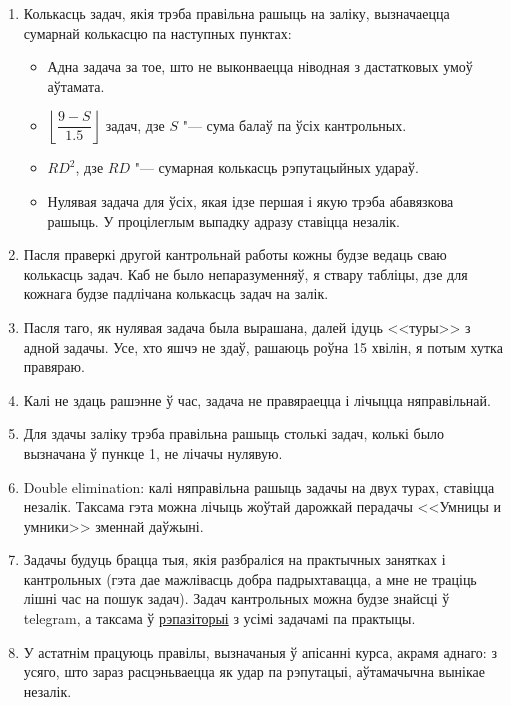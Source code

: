 \documentclass[12pt, a4paper]{extarticle}
\begin{document}
    \begin{enumerate}
        \item Колькасць задач, якія трэба правільна рашыць на заліку, вызначаецца сумарнай колькасцю па наступных пунктах:
        \begin{itemize}
            \item Адна задача за тое, што не выконваецца ніводная з дастатковых умоў аўтамата.
            \item $\left\lfloor \dfrac{9 - S}{1.5} \right\rfloor$ задач, дзе $S$ "--- сума балаў па ўсіх кантрольных.
            \item $RD^2$, дзе $RD$ "--- сумарная колькасць рэпутацыйных удараў.
            \item Нулявая задача для ўсіх, якая ідзе першая і якую трэба абавязкова рашыць. У процілеглым выпадку адразу ставіцца незалік.
        \end{itemize}
        \item Пасля праверкі другой кантрольнай работы кожны будзе ведаць сваю колькасць задач. Каб не было непаразуменняў, я ствару табліцы, дзе для кожнага будзе падлічана колькасць задач на залік.
        \item Пасля таго, як нулявая задача была вырашана, далей ідуць <<туры>> з адной задачы. Усе, хто яшчэ не здаў, рашаюць роўна 15 хвілін, я потым хутка правяраю. 
        \item Калі не здаць рашэнне ў час, задача не правяраецца і лічыцца няправільнай. 
        \item Для здачы заліку трэба правільна рашыць столькі задач, колькі было вызначана ў пункце 1, не лічачы нулявую.
        \item Double elimination: калі няправільна рашыць задачы на двух турах, ставіцца незалік. Таксама гэта можна лічыць жоўтай дарожкай перадачы <<Умницы и умники>> зменнай даўжыні.
        \item Задачы будуць брацца тыя, якія разбраліся на практычных занятках і кантрольных (гэта дае мажлівасць добра падрыхтавацца, а мне не траціць лішні час на пошук задач). Задач кантрольных можна будзе знайсці ў telegram, а таксама ў \href{https://github.com/bsu-docs/discrete-mathematics-problems}{рэпазіторыі} з усімі задачамі па практыцы.
        \item У астатнім працуюць правілы, вызначаныя ў апісанні курса, акрамя аднаго: з усяго, што зараз расцэньваецца як удар па рэпутацыі, аўтамачычна вынікае незалік.
    \end{enumerate}
\end{document}
